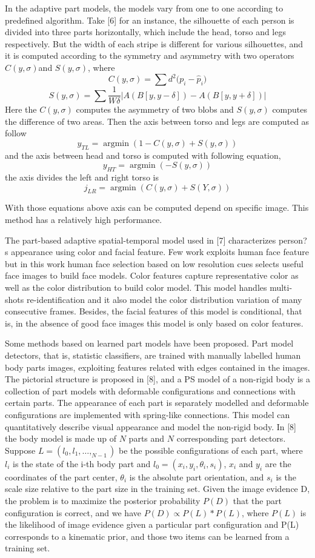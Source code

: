 \documentclass[conference,compsoc]{IEEEtran}
\begin{document}
In the adaptive part models, the models vary from one to one according to predefined algorithm. Take [6] for an instance, the silhouette of each person is divided into three parts horizontally, which include the head, torso and legs respectively. But the width of each stripe is different for various silhouettes, and it is computed according to the symmetry and asymmetry with two operators $C(y, \sigma) $and $S(y,\sigma)$, where 
$$C(y,\sigma) = \sum{d^2(p_i-{\hat{p}_i)}}$$
$$S(y,\sigma) = \sum{\frac{1}{W\delta}|A(B[y,y-\delta]) - A(B[y,y+\delta])|}$$
Here the $C(y, \sigma) $ computes the asymmetry of two blobs and $S(y,\sigma)$ computes the difference of two areas. Then the axis between torso and legs are computed as follow
$$y_{TL} = \mathop{\arg\min}(1-C(y,\sigma)+S(y,\sigma))$$
and the axis  between head and torso is computed with following equation,
$$y_{HT} = \mathop{\arg\min}(-S(y,\sigma))$$
the axis divides the left and right torso is
$$ j_{LR} = \mathop{\arg\min}(C(y,\sigma)+S(Y,\sigma))$$

With those equations above axis can be computed depend on specific image. This method has a relatively high performance.

The part-based adaptive spatial-temporal model used in [7] characterizes person?s appearance using color and facial feature. Few work exploits human face feature but in this work human face selection based on low resolution cues selects useful face images to build face models. Color features capture representative color as well as the color distribution to build color model. This model handles multi-shots re-identification and it also model the color distribution variation of many consecutive frames.  Besides, the facial features of this model is conditional, that is, in the absence of good face images this model is only based on color features.

Some methods based on learned part models have been proposed. Part model detectors, that is, statistic classifiers, are trained with manually labelled human body parts images, exploiting features related with edges contained in the images. The pictorial structure is proposed in [8], and a PS model of a non-rigid body is a collection of part models with deformable configurations and connections with certain parts. The appearance of each part is separately modelled and deformable configurations are implemented with spring-like connections. This model can quantitatively describe visual appearance and model the non-rigid body. In [8] the body model is made up of $N$ parts and $N$ corresponding part detectors. Suppose $L={(l_0,l_1,\ldots,_{N-1})}$ be the possible configurations of each part, where $l_i$ is the state of the i-th body part and $l_0=(x_i,y_i,\theta_i,s_i)$, $x_i$ and $y_i$ are the coordinates of the part center, $\theta_i$ is the absolute part orientation, and $s_i$ is the scale size relative to the part size in the training set.  Given the image evidence D, the problem is to maximize the posterior probability $P(D)$ that the part configuration is correct, and we have $P(D) \propto {P(L)*P(L)}$, where $P(L)$ is the likelihood of image evidence given a particular part configuration and P(L) corresponds to a kinematic prior, and those two items can be learned from a training set.
\end{document}
